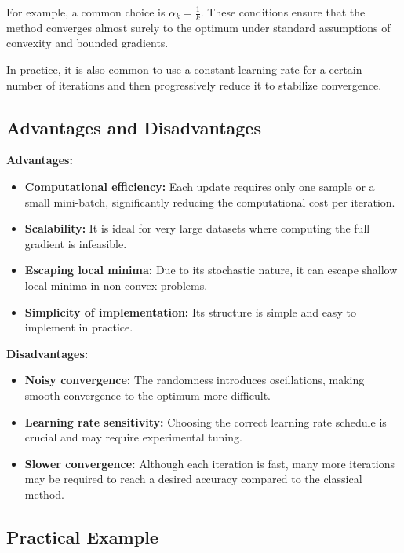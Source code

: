 \documentclass[12pt, letterpaper,conference]{IEEEtran}
\begin{document}
For example, a common choice is \( \alpha_k = \frac{1}{k} \). These conditions ensure that the method converges almost surely to the optimum under standard assumptions of convexity and bounded gradients.

In practice, it is also common to use a constant learning rate for a certain number of iterations and then progressively reduce it to stabilize convergence.


\vspace{0.25cm}

\subsection{Advantages and Disadvantages}

\textbf{Advantages:}
\begin{itemize}
    \item \textbf{Computational efficiency:} Each update requires only one sample or a small mini-batch, significantly reducing the computational cost per iteration.
    \item \textbf{Scalability:} It is ideal for very large datasets where computing the full gradient is infeasible.
    \item \textbf{Escaping local minima:} Due to its stochastic nature, it can escape shallow local minima in non-convex problems.
    \item \textbf{Simplicity of implementation:} Its structure is simple and easy to implement in practice.
\end{itemize}

\textbf{Disadvantages:}
\begin{itemize}
    \item \textbf{Noisy convergence:} The randomness introduces oscillations, making smooth convergence to the optimum more difficult.
    \item \textbf{Learning rate sensitivity:} Choosing the correct learning rate schedule is crucial and may require experimental tuning.
    \item \textbf{Slower convergence:} Although each iteration is fast, many more iterations may be required to reach a desired accuracy compared to the classical method.
\end{itemize}

\vspace{0.25cm}

\subsection{Practical Example}
\end{document}
